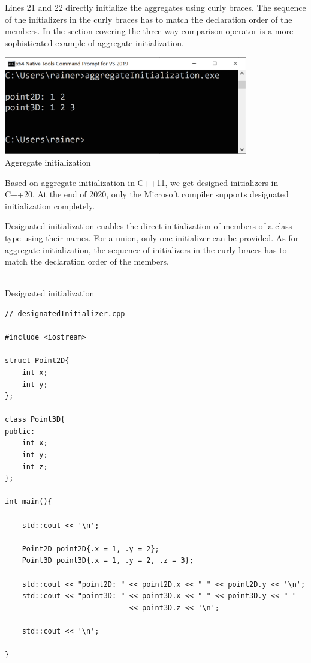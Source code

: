 Lines 21 and 22 directly initialize the aggregates using curly braces. The sequence of the initializers in the curly braces has to match the declaration order of the members. In the section covering the three-way comparison operator is a more sophisticated example of aggregate initialization.

\begin{center}
\includegraphics[width=0.8\textwidth]{content/3/chapter4/images/32.png}\\
Aggregate initialization
\end{center}

Based on aggregate initialization in C++11, we get designed initializers in C++20. At the end of 2020, only the Microsoft compiler supports designated initialization completely.


Designated initialization enables the direct initialization of members of a class type using their names. For a union, only one initializer can be provided. As for aggregate initialization, the sequence of initializers in the curly braces has to match the declaration order of the members.

\hspace*{\fill} \\ %
\noindent
Designated initialization
\begin{lstlisting}[style=styleCXX]
// designatedInitializer.cpp

#include <iostream>

struct Point2D{
	int x;
	int y;
};

class Point3D{
public:
	int x;
	int y;
	int z;
};

int main(){
	
	std::cout << '\n';
	
	Point2D point2D{.x = 1, .y = 2};
	Point3D point3D{.x = 1, .y = 2, .z = 3};
	
	std::cout << "point2D: " << point2D.x << " " << point2D.y << '\n';
	std::cout << "point3D: " << point3D.x << " " << point3D.y << " "
							 << point3D.z << '\n';
	
	std::cout << '\n';
	
}
\end{lstlisting}

